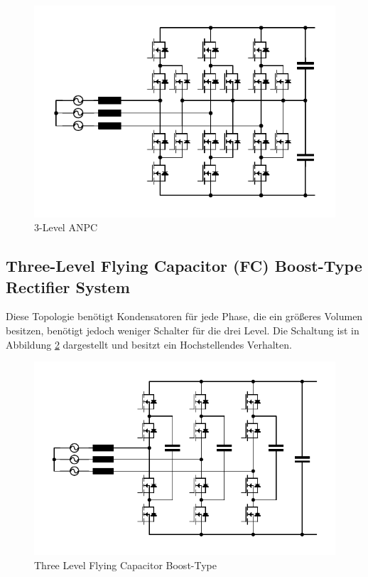 		\begin{figure}[H]
			\centering
			\includegraphics[width=0.9\linewidth]{content/Grafiken/ANPC}
			\caption{3-Level ANPC}
			\label{fig:anpc}
		\end{figure}
	
	
	\subsection{Three-Level Flying Capacitor (FC) Boost-Type Rectifier System}
		Diese Topologie benötigt Kondensatoren für jede Phase, die ein größeres Volumen besitzen, benötigt jedoch weniger Schalter für die drei Level. Die Schaltung ist in Abbildung \ref{fig:3l-fc-boost} dargestellt und besitzt ein Hochstellendes Verhalten.
		\begin{figure}[H]
			\centering
			\includegraphics[width=0.9\linewidth]{content/Grafiken/3L-FC-Boost}
			\caption{Three Level Flying Capacitor Boost-Type}
			\label{fig:3l-fc-boost}
		\end{figure}
	
